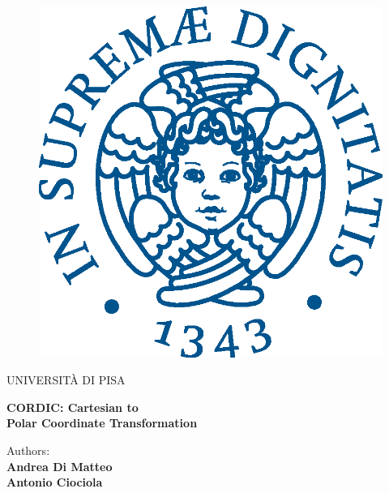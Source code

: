 \begin{titlepage}
\begin{figure}[!htb]

\begin{center}
{
    \includegraphics[keepaspectratio=true,scale=0.5]{images/Frontespizio/cherubinFrontespizio.eps}
}
\end{center}

\end{figure}

\begin{center}
    \LARGE{UNIVERSITÀ DI PISA}
\end{center}

\vspace{15mm}
\begin{center}
    {\LARGE{\bf CORDIC: Cartesian to  \\ \vspace{3mm} Polar Coordinate Transformation }}
\end{center}

\vspace{50mm}


\begin{minipage}[t]{0.47\textwidth}
	{
        \large{Authors:}
        {\normalsize\vspace{3mm}\bf\\ 
        \large{Andrea Di Matteo}
        \normalsize\vspace{3mm}\bf \\
        \large{Antonio Ciociola}
        }
    }
\end{minipage}


\vfill
\hrulefill
\\

\end{titlepage}
